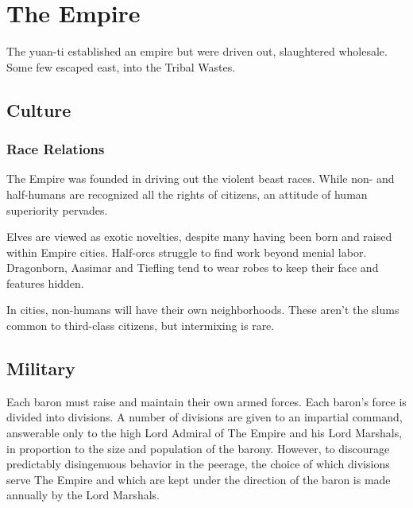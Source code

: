 \section{The Empire}

The yuan-ti established an empire but were driven out, slaughtered wholesale.
Some few escaped east, into the Tribal Wastes.

\subsection{Culture}
\subsubsection{Race Relations}
The Empire was founded in driving out the violent beast races.
While non- and half-humans are recognized all the rights of citizens, an attitude of human
 superiority pervades.

Elves are viewed as exotic novelties, despite many having been born and raised within Empire cities.
Half-orcs struggle to find work beyond menial labor.
Dragonborn, Aasimar and Tiefling tend to wear robes to keep their face and features hidden.

In cities, non-humans will have their own neighborhoods.
These aren't the slums common to third-class citizens, but intermixing is rare.

\subsection{Military}
Each baron must raise and maintain their own armed forces.
Each baron's force is divided into divisions.
A number of divisions are given to an impartial command, answerable only to the high Lord Admiral
 of The Empire and his Lord Marshals, in proportion to the size and population of the barony.
However, to discourage predictably disingenuous behavior in the peerage, the choice of which
 divisions serve The Empire and which are kept under the direction of the baron is made
 annually by the Lord Marshals.



